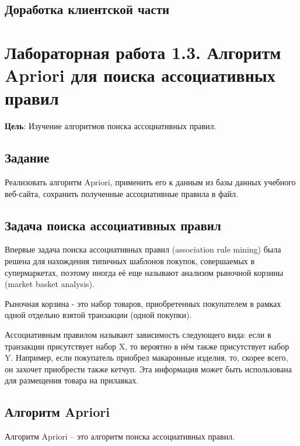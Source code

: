 \documentclass[a4paper,12pt]{report} %
\begin{document}
    \section{Доработка клиентской части}
    
    
    \chapter {Лабораторная работа 1.3. Алгоритм Apriori для поиска ассоциативных правил}
    \textbf{Цель}: Изучение алгоритмов поиска ассоциативных правил.
    
    
    \section{Задание}
    Реализовать алгоритм Apriori, применить его к данным из базы данных учебного веб-сайта, сохранить полученные ассоциативные правила в файл.
    
    \section{Задача поиска ассоциативных правил}
    Впервые задача поиска ассоциативных правил (association rule mining) была решена для нахождения типичных шаблонов покупок, совершаемых в супермаркетах, поэтому иногда её еще называют анализом рыночной корзины (market basket analysis). 
    
    Рыночная корзина - это набор товаров, приобретенных покупателем в рамках одной отдельно взятой транзакции (одной покупки).
    
    Ассоциативным правилом называют зависимость следующего вида: если в транзакции присутствует набор X, то вероятно в нём также присутствует набор Y. Например, если покупатель приобрел макаронные изделия, то, скорее всего, он захочет приобрести также кетчуп.  Эта информация может быть использована для размещения товара на прилавках.
    
    \section{Алгоритм Apriori}
    Алгоритм Apriori -- это алгоритм поиска ассоциативных правил.
    
    
    
    
    
    
    
    
	
\end{document}
